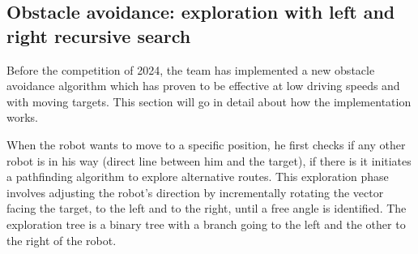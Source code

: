 \subsection{Obstacle avoidance: exploration with left and right recursive search}
Before the competition of 2024, the team has implemented a new obstacle avoidance algorithm which has
proven to be effective at low driving speeds and with moving targets. This section will go in detail about how the implementation works.

When the robot wants to move to a specific position, he first checks if any other robot is in his way (direct line between him and the target), if there is it initiates a pathfinding algorithm to explore alternative routes. This exploration phase involves adjusting the robot's direction by incrementally rotating the vector facing the target, to the left and to the right, until a free angle is identified. The exploration tree is a binary tree with a branch going to the left and the other to the right of the robot.

